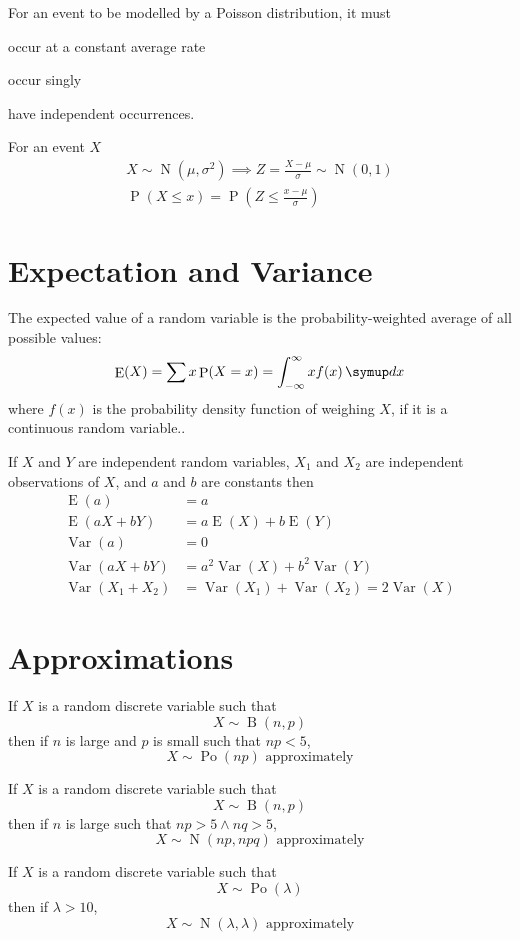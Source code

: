 \documentclass{slnotes}
\DeclareMathOperator*{\Prb}{P}
\DeclareMathOperator*{\Pois}{Po}
\DeclareMathOperator*{\Binom}{B}
\DeclareMathOperator*{\Norm}{N}
\DeclareMathOperator*{\Exp}{E}
\DeclareMathOperator*{\Var}{Var}
\begin{document}
For an event to be modelled by a Poisson distribution, it must \begin{slinenum}
\item occur at a constant average rate
\item occur singly
\item have independent occurrences.
\end{slinenum}

For an event \(X\) \begin{gather*}X \sim \Norm(\mu, \sigma^2) \implies Z = \frac{X-\mu}{\sigma} \sim\Norm(0, 1)\\\Prb(X \leq x) = \Prb(Z \leq \frac{x- \mu}{\sigma})\end{gather*}
\chapter{Expectation and Variance}
The expected value of a random variable is the prob\-ability-weighted average of all possible values: \[\Exp(X) = \sum x \Prb(X = x) = \int_{-\infty}^\infty xf(x)\slid x\] where \(f(x)\) is the probability density function of weighing \(X\), if it is a continuous random variable..

If \(X\) and \(Y\) are independent random variables, \(X_1\) and \(X_2\) are independent observations of \(X\), and \(a\) and \(b\) are constants then \begin{align*}\Exp(a) &= a\\\Exp(aX + bY) &= a\Exp(X) + b\Exp(Y)\\\Var(a) &= 0\\\Var(aX + bY) &= a^2\Var(X) + b^2\Var(Y)\\\Var(X_1 + X_2) &= \Var(X_1) + \Var(X_2) = 2\Var(X)\end{align*}
\chapter{Approximations}
If \(X\) is a random discrete variable such that \[X \sim \Binom(n, p)\] then if \(n\) is large and \(p\) is small such that \(np < 5\), \[X \sim \Pois(np)\text{ approximately}\]

If \(X\) is a random discrete variable such that \[X \sim \Binom(n, p)\] then if \(n\) is large such that \(np > 5 \wedge nq > 5\), \[X \sim \Norm(np,npq)\text{ approximately}\]

If \(X\) is a random discrete variable such that \[X \sim \Pois(\lambda)\] then if \(\lambda > 10\), \[X \sim \Norm(\lambda,\lambda)\text{ approximately}\]
\end{document}
